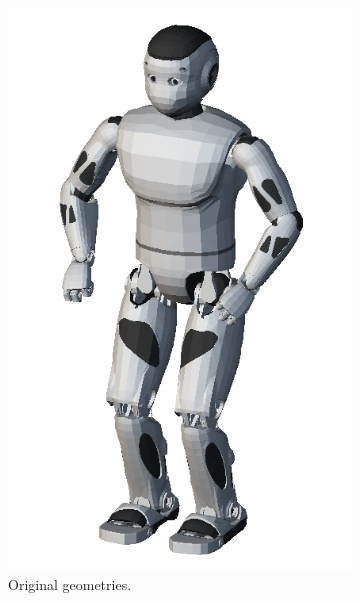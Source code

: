 \begin{figure}
  \centering
  \begin{subfigure}{0.24\columnwidth}
    \centering
    \includegraphics[width = \columnwidth]
                    {src/chap3-optimal-motion-planning/figure/romeo-full-mesh.png}
    \caption{Original geometries.}
    \label{simple-pathb}
  \end{subfigure}
  \begin{subfigure}{0.24\columnwidth}
    \centering

\end{subfigure}
\end{figure}
